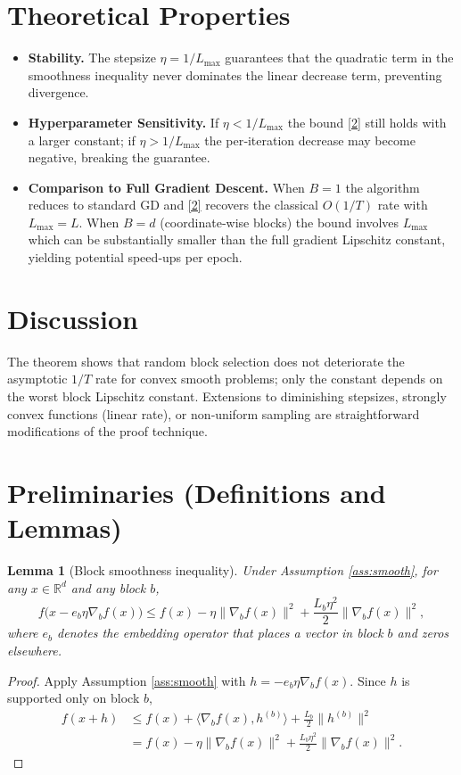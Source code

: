 \documentclass{article}
\newtheorem{lemma}{Lemma}
\newcommand{\R}{\mathbb{R}}
\begin{document}
\section*{Theoretical Properties}
\begin{itemize}[leftmargin=*]
\item \textbf{Stability.} The stepsize $\eta=1/L_{\max}$ guarantees that the
quadratic term in the smoothness inequality never dominates the linear
decrease term, preventing divergence.
\item \textbf{Hyperparameter Sensitivity.}
If $\eta<1/L_{\max}$ the bound \eqref{2} still holds with a larger constant;
if $\eta>1/L_{\max}$ the per‑iteration decrease may become negative,
breaking the guarantee.
\item \textbf{Comparison to Full Gradient Descent.}
When $B=1$ the algorithm reduces to standard GD and \eqref{2} recovers the classical $O(1/T)$ rate with $L_{\max}=L$.
When $B=d$ (coordinate‑wise blocks) the bound involves $L_{\max}$ which can be
substantially smaller than the full gradient Lipschitz constant, yielding
potential speed‑ups per epoch.
\end{itemize}

\section*{Discussion}
The theorem shows that random block selection does not deteriorate the
asymptotic $1/T$ rate for convex smooth problems; only the constant depends on the
worst block Lipschitz constant.  Extensions to diminishing stepsizes, strongly
convex functions (linear rate), or non‑uniform sampling are straightforward
modifications of the proof technique.

\newpage

\section*{Preliminaries (Definitions and Lemmas)}
\begin{lemma}[Block smoothness inequality]\label{lem:smooth}
Under Assumption \ref{ass:smooth}, for any $x\in\R^{d}$ and any block $b$,
\[
f\!\big(x-e_{b}\eta\nabla_{b}f(x)\big)
\le f(x)-\eta\|\nabla_{b}f(x)\|^{2}
+\frac{L_{b}\eta^{2}}{2}\|\nabla_{b}f(x)\|^{2},
\]
where $e_{b}$ denotes the embedding operator that places a vector in block $b$
and zeros elsewhere.
\end{lemma}
\begin{proof}
Apply Assumption \ref{ass:smooth} with $h=-e_{b}\eta\nabla_{b}f(x)$.
Since $h$ is supported only on block $b$,
\[
\begin{aligned}
f(x+h) &\le f(x)+\langle \nabla_{b}f(x),h^{(b)}\rangle
        +\frac{L_{b}}{2}\|h^{(b)}\|^{2}\\
&=f(x)-\eta\|\nabla_{b}f(x)\|^{2}
   +\frac{L_{b}\eta^{2}}{2}\|\nabla_{b}f(x)\|^{2}.
\end{aligned}
\]
\end{proof}
\end{document}

